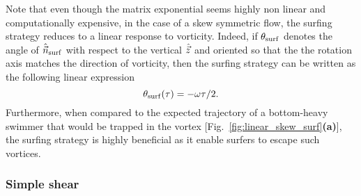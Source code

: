Note that even though the matrix exponential seems highly non linear and computationally expensive, in the case of a skew symmetric flow, the surfing strategy reduces to a linear response to vorticity.
Indeed, if $\theta_{\mathrm{surf}}$ denotes the angle of $\hat{\vec{n}}_{\mathrm{surf}}$ with respect to the vertical $\hat{\vec{z}}$ and oriented so that the the rotation axis matches the direction of vorticity, then the surfing strategy can be written as the following linear expression
\begin{equation}
	\theta_{\mathrm{surf}}(\tau) = -\omega \tau/2.
\end{equation}
Furthermore, when compared to the expected trajectory of a bottom-heavy swimmer that would be trapped in the vortex [Fig.~\ref{fig:linear_skew_surf}\textbf{(a)}], the surfing strategy is highly beneficial as it enable surfers to escape such vortices.

\subsubsection{Simple shear}

